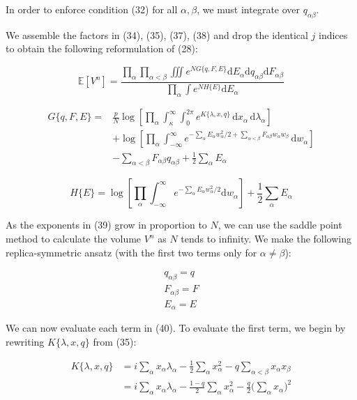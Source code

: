 In order to enforce condition (32) for all $\alpha, \beta$, we must integrate over $q_{\alpha\beta}$.

We assemble the factors in (34), (35), (37), (38) and drop the identical $j$ indices to obtain the following reformulation of (28):

\begin{equation}
    \mathbb{E}[V^n] = \frac{ \prod_\alpha \prod_{\alpha < \beta} \iiint e^{N G\{q, F, E\}} \mathrm{d} E_\alpha \mathrm{d} q_{\alpha\beta} \mathrm{d} F_{\alpha\beta} }{ \prod_\alpha \int e ^{N H\{E\}} \mathrm{d} E_\alpha }
\end{equation}

\begin{align}
    G\{q, F, E\} = 
    & \frac{p}{N} \log \left[ \prod_\alpha \int_\kappa^{\infty} \int_0^{2 \pi} e^{K\{\lambda, x, q\}} \, \mathrm{d} x_\alpha \, \mathrm{d} \lambda_\alpha \right]
    \nonumber \\ & + \log \left[ \prod_\alpha \int_{- \infty}^{\infty} e^{- \sum_\alpha E_\alpha w_\alpha^2 / 2 + \sum_{\alpha < \beta} F_{\alpha\beta} w_\alpha w_\beta} \, \mathrm{d} w_\alpha \right]
    \nonumber \\ & - \sum_{\alpha < \beta} F_{\alpha\beta} q_{\alpha\beta} + \frac{1}{2} \sum_\alpha E_\alpha
\end{align}

\begin{equation}
    H\{E\} = \log \left[ \prod_\alpha \int_{- \infty}^{\infty} e^{-\sum_\alpha E_\alpha w_\alpha^2 / 2} \mathrm{d} w_\alpha \right] + \frac{1}{2} \sum_\alpha E_\alpha
\end{equation}

As the exponents in (39) grow in proportion to $N$, we can use the saddle point method to calculate the volume $V^n$ as $N$ tends to infinity. We make the following replica-symmetric ansatz (with the first two terms only for $\alpha \neq \beta$):

\begin{gather}
    q_{\alpha \beta} = q \nonumber \\
    F_{\alpha \beta} = F \nonumber \\
    E_\alpha = E
\end{gather}

We can now evaluate each term in (40). To evaluate the first term, we begin by rewriting $K\{\lambda, x, q\}$ from (35):

\begin{align}
    K\{\lambda, x, q\}
    & = i \sum_\alpha x_\alpha \lambda_\alpha - \frac{1}{2} \sum_\alpha x_\alpha^2 - q \sum_{\alpha < \beta} x_\alpha x_\beta \nonumber \\
    & = i \sum_\alpha x_\alpha \lambda_\alpha - \frac{1 - q}{2} \sum_\alpha x_\alpha^2 - \frac{q}{2} \Big( \sum_\alpha x_\alpha \Big) ^2
\end{align}

